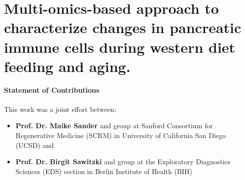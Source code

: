 
\chapter{Multi-omics-based approach to characterize changes in pancreatic immune cells during western diet feeding and aging.}
\label{chapter2}

\newpage

\begin{Comment2}
\vspace{5mm}
\label{contr:chapter2}
\hspace{-3mm}
\textbf{Statement of Contributions} \\\\
This work was a joint effort between:

\begin{itemize}
  \item \textbf{Prof. Dr. Maike Sander} and group at Sanford Consortium for Regenerative Medicine (SCRM) in University of California San Diego (UCSD)  and
  \item  \textbf{Prof. Dr. Birgit Sawitzki} and group at the Exploratory Diagnostics Sciences (EDS) section in Berlin Institute of Health (BIH)
\end{itemize}


\end{Comment2}
